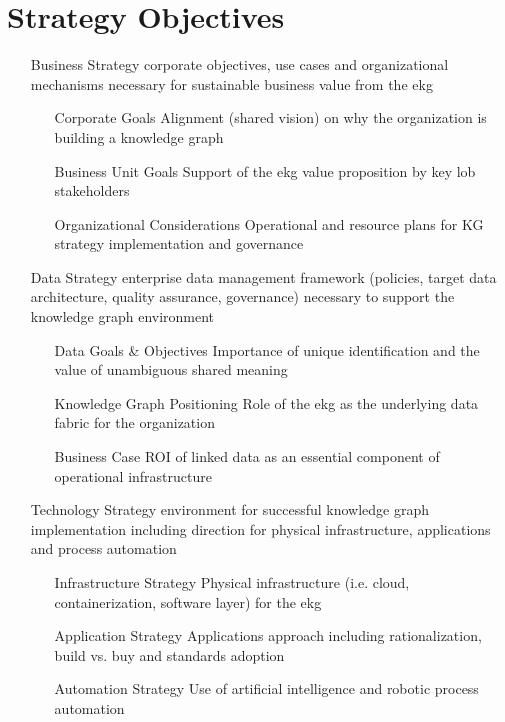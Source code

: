 \section{Strategy Objectives}
%
%
\begin{itemize}[leftmargin=2in,font=\bfseries]
  \item [Business Strategy] corporate objectives, use cases and organizational mechanisms necessary for sustainable business value from the \acrfull{ekg}
  \begin{itemize}[labelwidth=1.5in,leftmargin=0in]
    \item [Corporate Goals] Alignment (shared vision) on why the organization is building a knowledge graph
    \item [Business Unit Goals] Support of the \acrshort{ekg} value proposition by key \acrshort{lob} stakeholders
    \item [Organizational Considerations] Operational and resource plans for KG strategy implementation and governance
  \end{itemize}
  \item [Data Strategy] enterprise data management framework (policies, target data architecture, quality assurance, governance) necessary to support the knowledge graph environment
    \begin{itemize}[labelwidth=1.5in,leftmargin=0in]
      \item [Data Goals \& Objectives] Importance of unique identification and the value of unambiguous shared meaning
      \item [Knowledge Graph Positioning] Role of the \acrshort{ekg} as the underlying data fabric for the organization
      \item [Business Case] ROI of linked data as an essential component of operational infrastructure
    \end{itemize}
  \item [Technology Strategy] environment for successful knowledge graph implementation including direction for physical infrastructure, applications and process automation
    \begin{itemize}[labelwidth=1.5in,leftmargin=0in]
      \item [Infrastructure Strategy] Physical infrastructure (i.e. cloud, containerization, software layer) for the \acrshort{ekg}
      \item [Application Strategy] Applications approach including rationalization, build vs. buy and standards adoption
      \item [Automation Strategy] Use of artificial intelligence and robotic process automation
    \end{itemize}
\end{itemize}

